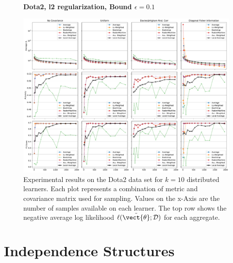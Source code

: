     \begin{landscape}
        \begin{figure}
            \centering
            \textbf{Dota2, l2 regularization, Bound $\epsilon=0.1$}\par\medskip
            \includegraphics[height=\dimexpr \textheight - 4\baselineskip\relax]{kapitel/figures/dota2_l2_0.1.pdf}
            \caption[Dota2 plots with l2 regularization and $\epsilon=0.1$]{Experimental results on the Dota2 data set for $k=10$ distributed learners. Each plot represents a combination of metric and covariance matrix used for sampling. Values on the x-Axis are the number of samples available on each learner. The top row shows the negative average log likelihood $\ell(\tilde{\vect{\theta}}; \mathcal{D})$ for each aggregate.}
            \label{fig:analysis12}
        \end{figure}
    \end{landscape}

\section{Independence Structures}
\label{sec:apdx:struc}





\clearpage
